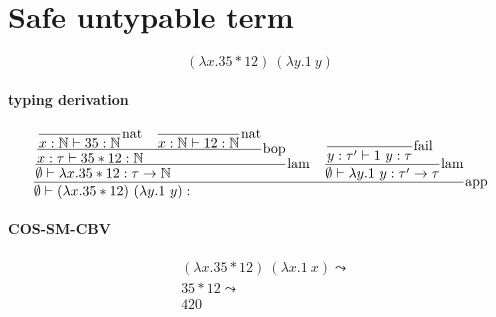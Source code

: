 \documentclass{article}
\newcommand{\st}[3][]{\ensuremath{\displaystyle\frac{#3\hfill}{#2\hfill} \text{#1}}}
\newcommand{\N}{\ensuremath \mathbb N}
\newcommand{\lam}[2]{\ensuremath{\lambda#1.#2}}
\begin{document}

\section{Safe untypable term}
\begin{equation*}
    (\lam{x}{35*12})\ (\lam{y}{1\ y})
\end{equation*}

\paragraph{typing derivation}
\begin{align*}
    \st[app]{
        \emptyset\vdash (\lam{x}{35*12})\ (\lam{y}{1\ y}): 
    }{
        \st[lam]{
            \emptyset\vdash \lam{x}{35*12}:\tau\to\N
        }{
            \st[bop]{
                x:\tau\vdash 35*12:\N
            }{
                \st[nat]{
                    x:\N\vdash 35:\N
                }{}
                \quad
                \st[nat]{
                    x:\N\vdash 12:\N
                }{}
            }
        }
        \quad
        \st[lam]{
            \emptyset\vdash \lam{y}{1\ y}: \tau'\to\tau
        }{
            \st[fail]{
                y:\tau'\vdash 1\ y: \tau
            }{}
        }
    }
\end{align*}

\paragraph{COS-SM-CBV}
\begin{align*}
    & (\lam{x}{35*12})\ (\lam{x}{1\ x}) \leadsto \\
    & 35*12 \leadsto \\
    & 420
\end{align*}
\end{document}
